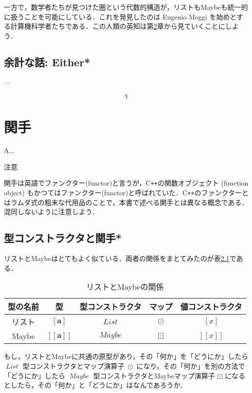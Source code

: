 \documentclass[a4paper,draft]{jsbook}
\def\[{\left[\!\left[}
\def\]{\right]\!\right]}
\newcommand{\programminglanguage}[1]{\textsf{#1}}
\newcommand{\cxx}{\programminglanguage{C}\texttt{++}}
\newenvironment{leader}{\begingroup}{\endgroup}
\newenvironment{caution}{\begin{boxnote}\begin{center}注意\end{center}}{\end{boxnote}}
\newcommand{\mType}[1]{\mathbf{#1}}
\newcommand{\mListType}[1]{[\mType{#1}]}
\newcommand{\mMaybeType}[1]{\[\mType{#1}\]}
\newcommand{\mTypeConstructor}[1]{\mathit{#1}} %
\newcommand{\mListOf}[1]{\left[#1\right]}
\newcommand{\mMaybeOf}[1]{\[#1\]}
\DeclareMathOperator{\mMapList}{\odot}
\DeclareMathOperator{\mMapMaybe}{\boxdot}
\DeclareMathOperator{\mListTypeConstructor}{\mTypeConstructor{List}}
\DeclareMathOperator{\mMaybeTypeConstructor}{\mTypeConstructor{Maybe}}
\newcommand{\mathMaybeMap}{\mathbin{\boxdot}}
\begin{document}
一方で，数学者たちが見つけた圏という代数的構造が，リストもMaybeも統一的に扱うことを可能にしている．これを発見したのは Eugenio Moggi を始めとする計算機科学者たちである．この人類の英知は第\ref{ch:functor}章から見ていくことにしよう．


\section{余計な話: Either*}

---

$$\chi$$

\chapter{関手}
\label{ch:functor}

\begin{leader}
A...
\end{leader}

\begin{caution}
関手は英語でファンクター(functor)と言うが，\cxx の関数オブジェクト (function object) もかつてはファンクター(functor)と呼ばれていた．\cxx のファンクターとはラムダ式の粗末な代用品のことで，本書で述べる関手とは異なる概念である．混同しないように注意しよう．
\end{caution}


\section{型コンストラクタと関手*}

リストとMaybeはとてもよく似ている．両者の関係をまとてみたのが表\ref{tab:list-and-maybe}である．

\begin{table}
\label{tab:list-and-maybe}
\caption{リストとMaybeの関係}
\begin{center}
\begin{tabular}{||c|c|c|c|c||}\hline
型の名前&型&型コンストラクタ&マップ&値コンストラクタ\\\hline\hline
リスト&$\mListType{a}$&$\mListTypeConstructor$&$\mMapList$&$\mListOf{x}$\\
Maybe&$\mMaybeType{a}$&$\mMaybeTypeConstructor$&$\mMapMaybe$&$\mMaybeOf{x}$\\\hline
\end{tabular}
\end{center}
\end{table}

もし，リストとMaybeに共通の原型があり，その「何か」を「どうにか」したら $\mListTypeConstructor$ 型コンストラクタとマップ演算子 $\mMapList$ になり，その「何か」を別の方法で「どうにか」したら $\mMaybeTypeConstructor$ 型コンストラクタとMaybeマップ演算子 $\mathMaybeMap$ になるとしたら，その「何か」と「どうにか」はなんであろうか．
\end{document}
